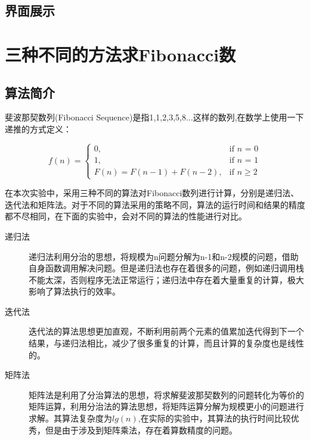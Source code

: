 \documentclass[UTF8]{ctexart}
\begin{document}
\subsection{界面展示}

\section{三种不同的方法求Fibonacci数}

\subsection{算法简介}
斐波那契数列(Fibonacci Sequence)是指1,1,2,3,5,8$\dots$这样的数列,在数学上使用一下递推的方式定义：

\begin{equation*}
    f(n) =
    \begin{cases}
    0, & \mbox{if }n\mbox{ = 0} \\
    1, & \mbox{if }n\mbox{ = 1} \\
    F(n)=F(n-1)+F(n-2), & \mbox{if }n \geq 2
    \end{cases}    
\end{equation*}

在本次实验中，采用三种不同的算法对Fibonacci数列进行计算，分别是递归法、迭代法和矩阵法。对于不同的算法采用的策略不同，算法的运行时间和结果的精度都不尽相同，在下面的实验中，会对不同的算法的性能进行对比。

\begin{description}
\item[递归法] 递归法利用分治的思想，将规模为n问题分解为n-1和n-2规模的问题，借助自身函数调用解决问题。但是递归法也存在着很多的问题，例如递归调用栈不能太深，否则程序无法正常运行；递归法中存在着大量重复的计算，极大影响了算法执行的效率。
\item[迭代法]
迭代法的算法思想更加直观，不断利用前两个元素的值累加迭代得到下一个结果，与递归法相比，减少了很多重复的计算，而且计算的复杂度也是线性的。
\item[矩阵法]
矩阵法是利用了分治算法的思想，将求解斐波那契数列的问题转化为等价的矩阵运算，利用分治法的算法思想，将矩阵运算分解为规模更小的问题进行求解。其算法复杂度为$lg(n)$,在实际的实验中，其算法的执行时间比较优秀，但是由于涉及到矩阵乘法，存在着算数精度的问题。
\end{description} 
\end{document}
